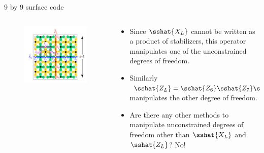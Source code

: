 \documentclass{beamer}
\begin{document}
    \begin{frame}{9 by 9 surface code}
        \begin{minipage}[0.65\textheight]{\textwidth}
        \begin{columns}[T]
            \begin{column}{0.4\textwidth}
                \begin{figure}[t]
                    \centering
                    \includegraphics[height=0.6\textheight]{./Images/surf-code-logical.jpg}
                \end{figure}
            \end{column}
            \begin{column}{0.6\textwidth}
                \begin{itemize}
                \item Since $ \sshat{X_L} $ cannot be written as a product of stabilizers, this operator manipulates one of the unconstrained degrees of freedom.
                \item Similarly $ \sshat{Z_L} = \sshat{Z_6}\sshat{Z_7}\sshat{Z_3}\sshat{Z_8}\sshat{Z_9}$ manipulates the other degree of freedom.
                \item Are there any other methods to manipulate unconstrained degrees of freedom other than $ \sshat{X_L} $ and $ \sshat{Z_L} $? No!
                \end{itemize}
            \end{column}
        \end{columns}
        \end{minipage}
    \end{frame}
    
\end{document}

